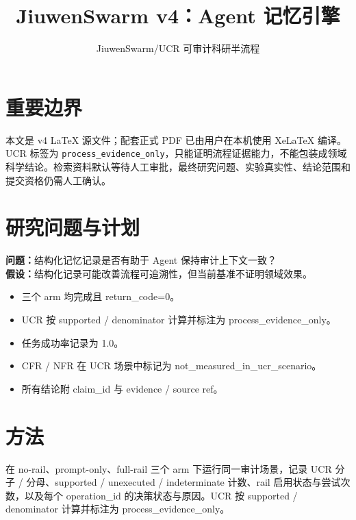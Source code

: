 \documentclass[UTF8]{ctexart}
\title{JiuwenSwarm v4：Agent 记忆引擎}
\author{JiuwenSwarm/UCR 可审计科研半流程}
\date{}
\begin{document}
\maketitle
\section{重要边界}
本文是 v4 LaTeX 源文件；配套正式 PDF 已由用户在本机使用 XeLaTeX 编译。UCR 标签为 \texttt{process\_evidence\_only}，只能证明流程证据能力，不能包装成领域科学结论。检索资料默认等待人工审批，最终研究问题、实验真实性、结论范围和提交资格仍需人工确认。
\section{研究问题与计划}
\textbf{问题：}结构化记忆记录是否有助于 Agent 保持审计上下文一致？\\
\textbf{假设：}结构化记录可能改善流程可追溯性，但当前基准不证明领域效果。
\begin{itemize}
\item 三个 arm 均完成且 return\_\allowbreak{}code=0。
\item UCR 按 supported / denominator 计算并标注为 process\_\allowbreak{}evidence\_\allowbreak{}only。
\item 任务成功率记录为 1.0。
\item CFR / NFR 在 UCR 场景中标记为 not\_\allowbreak{}measured\_\allowbreak{}in\_\allowbreak{}ucr\_\allowbreak{}scenario。
\item 所有结论附 claim\_\allowbreak{}id 与 evidence / source ref。
\end{itemize}
\section{方法}
在 no-\allowbreak{}rail、prompt-\allowbreak{}only、full-\allowbreak{}rail 三个 arm 下运行同一审计场景，记录 UCR 分子 / 分母、supported / unexecuted / indeterminate 计数、rail 启用状态与尝试次数，以及每个 operation\_\allowbreak{}id 的决策状态与原因。UCR 按 supported / denominator 计算并标注为 process\_\allowbreak{}evidence\_\allowbreak{}only。
\end{document}
